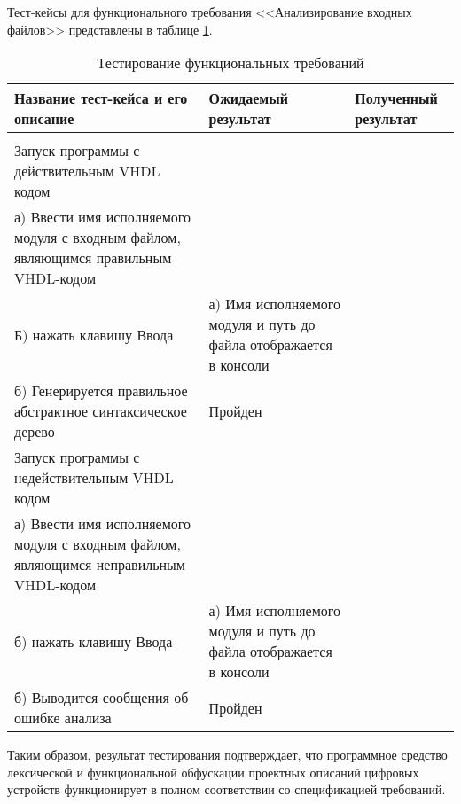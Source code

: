    Тест-кейсы для функционального требования <<Анализирование входных файлов>> представлены в таблице \ref{sec:testing:analyzing_cases}.
   \pagebreak
\begin{longtable}[l]{| >{\raggedright}m{}
                  | >{\raggedright}m{}
                  | >{\raggedright\arraybackslash}m{}|}
  \caption{Тестирование функциональных требований}
  \label{sec:testing:analyzing_cases} \tabularnewline

  \hline
    Название тест-кейса и его описание & Ожидаемый результат & Полученный результат
    \tabularnewline
   \hline
   \centering 1 & \centering 2 & \centering 3 \tabularnewline
   \hline
   Запуск программы с действительным VHDL кодом \\
   а) Ввести имя исполняемого модуля с входным файлом, являющимся правильным VHDL-кодом \\
   Б) нажать клавишу Ввода
   &
   а) Имя исполняемого модуля и путь до файла отображается в консоли \\
   б) Генерируется правильное абстрактное синтаксическое дерево
   &
   Пройден \\

   \hline
   Запуск программы с недействительным VHDL кодом \\
   а) Ввести имя исполняемого модуля с входным файлом, являющимся неправильным VHDL-кодом \\
   б) нажать клавишу Ввода
   &
   а) Имя исполняемого модуля и путь до файла отображается в консоли \\
   б) Выводится сообщения об ошибке анализа
   &
   Пройден \\
   \hline
\end{longtable}
Таким образом, результат тестирования подтверждает, что программное средство лексической и функциональной обфускации проектных описаний цифровых устройств функционирует в полном соответствии со спецификацией требований.

